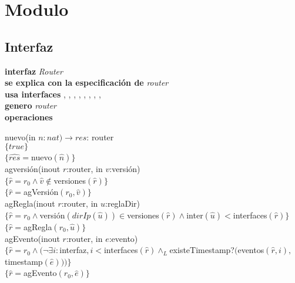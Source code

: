 \documentclass[11pt, a4paper]{article}
\begin{document}
\section{Modulo }

\vspace{22pt}

\subsection*{Interfaz}
\hspace{-0.75cm}
\textbf{interfaz} \textit{Router}\\
\textbf{se explica con la especificaci\'on de} \textit{router}\\
\textbf{usa interfaces} , , ,  ,  , , , , \\
\textbf{genero} \textit{router}\\
\textbf{operaciones}



nuevo(in $n:nat)\rightarrow res$: router\\
$\{true\}$\\
$\{\widehat{res}=$nuevo$(\widehat{n})\}$\\

agversi\'on(inout $r$:router, in $v$:versi\'on)\\
$\{\widehat{r}= r_0 \wedge \widehat{v} \notin $versiones$(\widehat{r})\}$\\
$\{\widehat{r}=$agVersi\'on$(r_0,\widehat{v})\}$\\

agRegla(inout $r$:router, in $u$:reglaDir)\\
$\{\widehat{r}=r_0 \wedge $versi\'on$(dirIp(\widehat{u}))\in $versiones$(\widehat{r}) \wedge $inter$(\widehat{u}) < $interfaces$(\widehat{r})\}$\\
$\{\widehat{r}=$agRegla$(r_0,\widehat{u})\}$\\

agEvento(inout $r$:router, in $e$:evento)\\
$\{\widehat{r}=r_0 \wedge (\neg \exists i: $interfaz$, i < $interfaces$(\widehat{r}) \wedge_L $existeTimestamp?$($eventos$(\widehat{r},i),$timestamp$(\widehat{e})))\}$\\
$\{\widehat{r}=$agEvento$(r_0,\widehat{e})\}$\\
\end{document}

